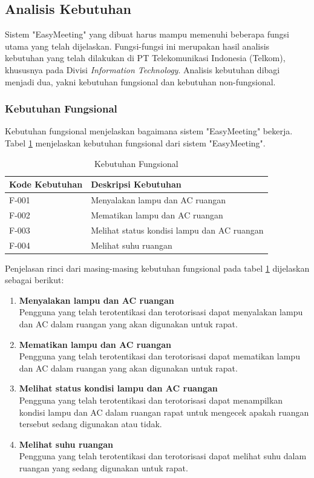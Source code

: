 \subsection{Analisis Kebutuhan}
\tab Sistem "EasyMeeting" yang dibuat harus mampu memenuhi beberapa fungsi utama yang telah dijelaskan. Fungsi-fungsi ini merupakan hasil analisis kebutuhan yang telah dilakukan di PT Telekomunikasi Indonesia (Telkom), khususnya pada Divisi \textit{Information Technology}. Analisis kebutuhan dibagi menjadi dua, yakni kebutuhan fungsional dan kebutuhan non-fungsional.

\subsubsection{Kebutuhan Fungsional}
\tab Kebutuhan fungsional menjelaskan bagaimana sistem "EasyMeeting" bekerja. Tabel \ref{table:kebutuhan_fungsional} menjelaskan kebutuhan fungsional dari sistem "EasyMeeting".

\begin{table}[H]
	\centering
	\begin{tabular}{ | p{3cm} | p{6cm} | }
		\hline
		\textbf{Kode Kebutuhan} & \textbf{Deskripsi Kebutuhan} \\ \hline
		F-001 & Menyalakan lampu dan AC ruangan \\ \hline
		F-002 & Mematikan lampu dan AC ruangan \\ \hline
		F-003 & Melihat status kondisi lampu dan AC ruangan \\ \hline
		F-004 & Melihat suhu ruangan \\ \hline
	\end{tabular} \caption{Kebutuhan Fungsional}
	\label{table:kebutuhan_fungsional}
\end{table}

Penjelasan rinci dari masing-masing kebutuhan fungsional pada tabel \ref{table:kebutuhan_fungsional} dijelaskan sebagai berikut:
\begin{enumerate}
	\item \textbf{Menyalakan lampu dan AC ruangan} \\
	\tab Pengguna yang telah terotentikasi dan terotorisasi dapat menyalakan lampu dan AC dalam ruangan yang akan digunakan untuk rapat.
	\item \textbf{Mematikan lampu dan AC ruangan} \\
	\tab Pengguna yang telah terotentikasi dan terotorisasi dapat mematikan lampu dan AC dalam ruangan yang akan digunakan untuk rapat.
	\item \textbf{Melihat status kondisi lampu dan AC ruangan} \\
	\tab Pengguna yang telah terotentikasi dan terotorisasi dapat menampilkan kondisi lampu dan AC dalam ruangan rapat untuk mengecek apakah ruangan tersebut sedang digunakan atau tidak.
	\item \textbf{Melihat suhu ruangan} \\
	\tab Pengguna yang telah terotentikasi dan terotorisasi dapat melihat suhu dalam ruangan yang sedang digunakan untuk rapat.
\end{enumerate}

